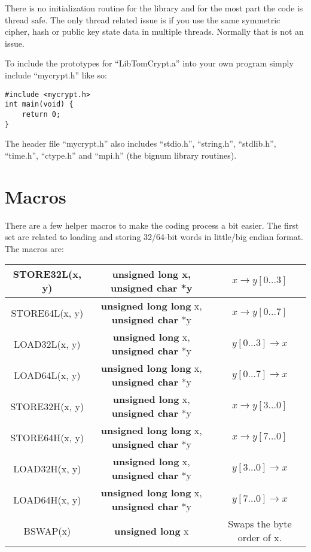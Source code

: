 \documentclass[b5paper]{book}
\begin{document}
There is no initialization routine for the library and for the most part the code is thread safe.  The only thread
related issue is if you use the same symmetric cipher, hash or public key state data in multiple threads.  Normally
that is not an issue.

To include the prototypes for ``LibTomCrypt.a'' into your own program simply include ``mycrypt.h'' like so:
\begin{verbatim}
#include <mycrypt.h>
int main(void) {
    return 0;
}
\end{verbatim}

The header file ``mycrypt.h'' also includes ``stdio.h'', ``string.h'', ``stdlib.h'', ``time.h'', ``ctype.h'' and ``mpi.h''
(the bignum library routines).

\section{Macros}

There are a few helper macros to make the coding process a bit easier.  The first set are related to loading and storing
32/64-bit words in little/big endian format.  The macros are:

   
    
\begin{small}
\begin{center}
\begin{tabular}{|c|c|c|}
     \hline STORE32L(x, y) & {\bf unsigned long} x, {\bf unsigned char} *y & $x \to y[0 \ldots 3]$ \\
     \hline STORE64L(x, y) & {\bf unsigned long long} x, {\bf unsigned char} *y & $x \to y[0 \ldots 7]$ \\
     \hline LOAD32L(x, y) & {\bf unsigned long} x, {\bf unsigned char} *y & $y[0 \ldots 3] \to x$ \\
     \hline LOAD64L(x, y) & {\bf unsigned long long} x, {\bf unsigned char} *y & $y[0 \ldots 7] \to x$ \\
     \hline STORE32H(x, y) & {\bf unsigned long} x, {\bf unsigned char} *y & $x \to y[3 \ldots 0]$ \\
     \hline STORE64H(x, y) & {\bf unsigned long long} x, {\bf unsigned char} *y & $x \to y[7 \ldots 0]$ \\
     \hline LOAD32H(x, y) & {\bf unsigned long} x, {\bf unsigned char} *y & $y[3 \ldots 0] \to x$ \\
     \hline LOAD64H(x, y) & {\bf unsigned long long} x, {\bf unsigned char} *y & $y[7 \ldots 0] \to x$ \\
     \hline BSWAP(x) & {\bf unsigned long} x & Swaps the byte order of x. \\
     \hline
\end{tabular}
\end{center}
\end{small}
\end{document}
